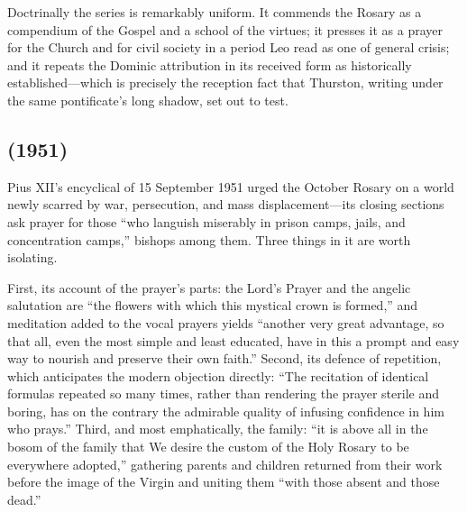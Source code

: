 Doctrinally the series is remarkably uniform. It commends the Rosary as
a compendium of the Gospel and a school of the virtues; it presses it as
a prayer for the Church and for civil society in a period Leo read as
one of general crisis; and it repeats the Dominic attribution in its
received form as historically established---which is precisely the
reception fact that Thurston, writing under the same pontificate's
long shadow, set out to test.

\subsection{ (1951)}

Pius XII's encyclical of 15 September 1951 urged the October Rosary on a
world newly scarred by war, persecution, and mass displacement---its
closing sections ask prayer for those ``who languish miserably in prison
camps, jails, and concentration camps,'' bishops among them. Three
things in it are worth isolating.

First, its account of the prayer's parts: the Lord's Prayer and the
angelic salutation are ``the flowers with which this mystical crown is
formed,'' and meditation added to the vocal prayers yields ``another
very great advantage, so that all, even the most simple and least
educated, have in this a prompt and easy way to nourish and preserve
their own faith.'' Second, its defence of repetition, which anticipates
the modern objection directly: ``The recitation of identical formulas
repeated so many times, rather than rendering the prayer sterile and
boring, has on the contrary the admirable quality of infusing confidence
in him who prays.'' Third, and most emphatically, the family: ``it is
above all in the bosom of the family that We desire the custom of the
Holy Rosary to be everywhere adopted,'' gathering parents and children
returned from their work before the image of the Virgin and uniting them
``with those absent and those dead.''

